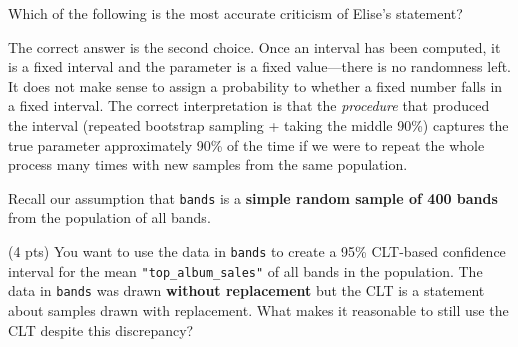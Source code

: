 \documentclass[twoside,12pt]{article}
\begin{document}
\begin{probset}
\begin{prob}[(16 pts)]
\begin{subprobset}
\begin{subprob}
\smallskip

Which of the following is the most accurate criticism of Elise's statement? 
 
\medskip
 

\smallskip
 
 
\smallskip
 
 

\smallskip
 
 
\begin{soln}
The correct answer is the second choice. Once an interval has been computed, it is a fixed interval and the parameter is a fixed value---there is no randomness left. It does not make sense to assign a probability to whether a fixed number falls in a fixed interval. The correct interpretation is that the \emph{procedure} that produced the interval (repeated bootstrap sampling + taking the middle 90\%) captures the true parameter approximately 90\% of the time if we were to repeat the whole process many times with new samples from the same population.
\end{soln}

\end{subprob}
\end{subprobset}
\end{prob}

\newpage

\begin{prob}[(17 pts)]
Recall our assumption that \texttt{bands} is a \textbf{simple random sample of 400 bands} from the population of all bands.

\begin{subprobset}

\begin{subprob}(4 pts) You want to use the data in \texttt{bands} to create a 95\% CLT-based confidence interval for the mean \texttt{"top\_album\_sales"} of all bands in the population. The data in \texttt{bands} was drawn \textbf{without replacement} but the CLT is a statement about samples drawn with replacement. What makes it reasonable to still use the CLT despite this discrepancy?


\end{subprob}
\end{subprobset}
\end{prob}
\end{probset}
\end{document}
